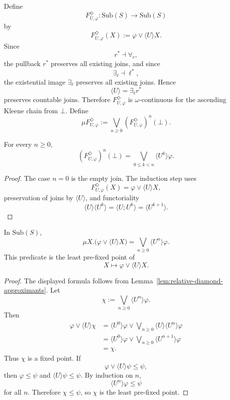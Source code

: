 Define
\[
F^\Diamond_{U,\varphi}:\mathrm{Sub}(S)\to\mathrm{Sub}(S)
\]
by
\[
F^\Diamond_{U,\varphi}(X)
:=
\varphi\vee\langle U\rangle X.
\]
Since
\[
r^\ast\dashv \forall_r,
\]
the pullback \(r^\ast\) preserves all existing joins, and since
\[
\exists_\ell\dashv \ell^\ast,
\]
the existential image \(\exists_\ell\) preserves all existing joins. Hence
\[
\langle U\rangle=\exists_\ell r^\ast
\]
preserves countable joins. Therefore \(F^\Diamond_{U,\varphi}\) is
\(\omega\)-continuous for the ascending Kleene chain from \(\bot\). Define
\[
\mu F^\Diamond_{U,\varphi}
:=
\bigvee_{n\ge0}(F^\Diamond_{U,\varphi})^n(\bot).
\]

\begin{lemma}
\label{lem:relative-diamond-approximants}
For every \(n\ge0\),
\[
(F^\Diamond_{U,\varphi})^n(\bot)
=
\bigvee_{0\le k<n}\langle U^k\rangle\varphi.
\]
\end{lemma}

\begin{proof}
The case \(n=0\) is the empty join. The induction step uses
\[
F^\Diamond_{U,\varphi}(X)=\varphi\vee\langle U\rangle X,
\]
preservation of joins by \(\langle U\rangle\), and functoriality
\[
\langle U\rangle\langle U^k\rangle
=
\langle U;U^k\rangle
=
\langle U^{k+1}\rangle.
\]
\end{proof}

\begin{theorem}
\label{thm:relative-diamond-lfp}
In \(\mathrm{Sub}(S)\),
\[
\mu X.\bigl(\varphi\vee\langle U\rangle X\bigr)
=
\bigvee_{n\ge0}\langle U^n\rangle\varphi.
\]
This predicate is the least pre-fixed point of
\[
X\mapsto \varphi\vee\langle U\rangle X.
\]
\end{theorem}

\begin{proof}
The displayed formula follows from
Lemma~\ref{lem:relative-diamond-approximants}. Let
\[
\chi:=\bigvee_{n\ge0}\langle U^n\rangle\varphi.
\]
Then
\[
\begin{aligned}
\varphi\vee\langle U\rangle\chi
&=
\langle U^0\rangle\varphi
\vee
\bigvee_{n\ge0}\langle U\rangle\langle U^n\rangle\varphi
\\
&=
\langle U^0\rangle\varphi
\vee
\bigvee_{n\ge0}\langle U^{n+1}\rangle\varphi
\\
&=
\chi.
\end{aligned}
\]
Thus \(\chi\) is a fixed point. If
\[
\varphi\vee\langle U\rangle\psi\le \psi,
\]
then \(\varphi\le\psi\) and \(\langle U\rangle\psi\le\psi\). By induction on
\(n\),
\[
\langle U^n\rangle\varphi\le\psi
\]
for all \(n\). Therefore \(\chi\le\psi\), so \(\chi\) is the least pre-fixed
point.
\end{proof}

